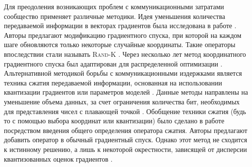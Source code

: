 \documentclass{ProcISPRAS}
\begin{document}
Для преодоления возникающих проблем с коммуникационными затратами сообщество применяет различные методики. Идея уменьшения количества передаваемой информации в векторах градиентов была исследована в работе \cite{nesterov2012efficiency}. Авторы предлагают модификацию градиентного спуска, при которой на каждом шаге обновляются только некоторые случайные координаты. Такие операторы впоследствии стали называть \textsc{Rand-K} \cite{beznosikov2023biased}. Через несколько лет метод координатного градиентного спуска был адаптирован для распределенной оптимизации \cite{richtarik2016distributed}. Альтернативной методикой борьбы с коммуникационными издержками является техника сжатия передаваемой информации, основанная на использовании квантизации градиентов или параметров моделей \cite{suresh2017distributed}. Данные методы направлены на уменьшение объема данных, за счет ограничения количества бит, необходимых для представления чисел с плавающей точкой \cite{wu2018error, wangni2018gradient, wen2017terngrad}. Обобщение техники сжатия (будь то с помощью выбора координат или квантизации) было сделано в работе \cite{alistarh2017qsgd} посредством введения общего определения оператора сжатия. Авторы предлагают добавить оператор в обычный градиентный спуск.
Однако этот метод не сходится к истинному решению, а лишь к некоторой окрестности, зависящей от дисперсии квантизованных оценок градиентов \cite{gorbunov2021distributed}.

\end{document}
